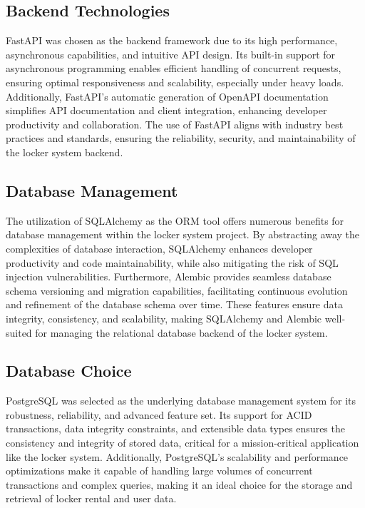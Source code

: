 \subsection{Backend Technologies}
FastAPI was chosen as the backend framework due to its high performance, asynchronous capabilities, and intuitive API design. Its built-in support for asynchronous programming enables efficient handling of concurrent requests, ensuring optimal responsiveness and scalability, especially under heavy loads. Additionally, FastAPI's automatic generation of OpenAPI documentation simplifies API documentation and client integration, enhancing developer productivity and collaboration. The use of FastAPI aligns with industry best practices and standards, ensuring the reliability, security, and maintainability of the locker system backend.

\subsection{Database Management}
The utilization of SQLAlchemy as the ORM tool offers numerous benefits for database management within the locker system project. By abstracting away the complexities of database interaction, SQLAlchemy enhances developer productivity and code maintainability, while also mitigating the risk of SQL injection vulnerabilities. Furthermore, Alembic provides seamless database schema versioning and migration capabilities, facilitating continuous evolution and refinement of the database schema over time. These features ensure data integrity, consistency, and scalability, making SQLAlchemy and Alembic well-suited for managing the relational database backend of the locker system.

\subsection{Database Choice}
PostgreSQL was selected as the underlying database management system for its robustness, reliability, and advanced feature set. Its support for ACID transactions, data integrity constraints, and extensible data types ensures the consistency and integrity of stored data, critical for a mission-critical application like the locker system. Additionally, PostgreSQL's scalability and performance optimizations make it capable of handling large volumes of concurrent transactions and complex queries, making it an ideal choice for the storage and retrieval of locker rental and user data.

